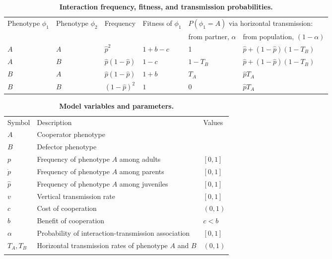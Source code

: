 \documentclass[12pt]{extarticle}
\begin{document}
{ 
\bigskip
\begin{table}[h]
\caption{\textbf{Interaction frequency, fitness, and transmission probabilities.}}
\begin{tabular}{@{}llllll@{}}
\toprule
\multirow{2}{*}{Phenotype $\phi_1$} &
  \multirow{2}{*}{Phenotype $\phi_2$} &
  \multirow{2}{*}{Frequency} &
  \multirow{2}{*}{Fitness of $\phi_1$} &
  \multicolumn{2}{l}{$P(\phi_1=A)$ via horizontal transmission:} \\ \cmidrule(l){5-6} 
    &     &                      &         & from partner, $\alpha$ & from population, $(1-\alpha)$ \\ \cmidrule(r){1-6}
$A$ & $A$ & $\hat{p}^2$          & $1+b-c$ & 1                      & $\hat{p}+(1-\hat{p})(1-T_B)$  \\
$A$ & $B$ & $\hat{p}(1-\hat{p})$ & $1-c$   & $1-T_B$                & $\hat{p}+(1-\hat{p})(1-T_B)$  \\
$B$ & $A$ & $\hat{p}(1-\hat{p})$ & $1+b$   & $T_A$                  & $\hat{p} T_A$                 \\
$B$ & $B$ & $(1-\hat{p})^2$      & $1$     & $0$                    & $\hat{p} T_A$                 \\ \bottomrule
\end{tabular}
\label{table:interactions}
\end{table}
\bigskip


\bigskip
\begin{table}[h]
\centering
\caption{\textbf{Model variables and parameters.}
}
\begin{tabular}{lll}
\toprule
Symbol & Description & Values \\ \cmidrule(r){1-3}
$A$ & Cooperator phenotype & \\
$B$ & Defector phenotype & \\
$p$ & Frequency of phenotype $A$ among adults & $[0,1]$ \\
$\dot p$ & Frequency of phenotype $A$ among parents & $[0,1]$ \\
$\hat p$ & Frequency of phenotype $A$ among juveniles & $[0,1]$ \\
$v$ & Vertical transmission rate & $[0,1]$ \\
$c$ & Cost of cooperation & $(0,1)$ \\
$b$ & Benefit of cooperation & $c<b$ \\
$\alpha$ & Probability of interaction-transmission association & $[0,1]$ \\
$T_A, T_B$ & Horizontal transmission rates of phenotype $A$ and $B$ & $(0,1)$ \\
\\ \bottomrule
\end{tabular}
\label{table:vars_params}
\end{table}

}
\end{document}
